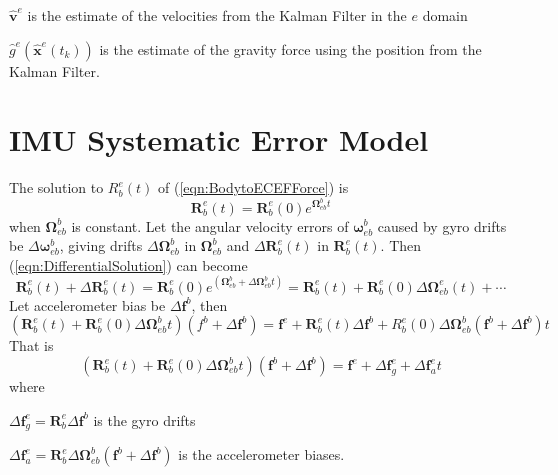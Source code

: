 \documentclass[a4paper]{report}
\numberwithin{equation}{chapter}
\newcommand{\mat}[1]{\boldsymbol{#1}}
\begin{document}
  $\hat{\mat{v}}^e$ is the estimate of the velocities from the Kalman Filter in the $e$ domain

  $\hat{g}^e \left( \hat{\mat{x}}^e \left(t_k \right) \right)$ is the estimate of the gravity force using the position from the Kalman Filter.

\section[IMU Systematic Error Model]{IMU Systematic Error Model}

The solution to $R^e_b \left( t \right)$ of (\ref{eqn:BodytoECEFForce}) is
\begin{equation}
\mat{R}^e_b \left( t \right) = \mat{R}^e_b \left( 0 \right) e^{\mat{\Omega}^b_{eb} t}
\label{eqn:DifferentialSolution}
\end{equation}
when $\mat{\Omega}^b_{eb}$ is constant. Let the angular velocity errors of $\mat{\omega}^b_{eb}$ caused by gyro drifts be $\Delta \mat{\omega}^b_{eb}$, giving drifts $\Delta \mat{\Omega}^b_{eb}$ in $\mat{\Omega}^b_{eb}$ and $\Delta \mat{R}^e_b \left( t \right)$ in $\mat{R}^e_b \left( t \right)$. Then (\ref{eqn:DifferentialSolution}) can become
\begin{equation}
\mat{R}^e_b \left( t \right) + \Delta \mat{R}^e_b \left( t \right) = \mat{R}^e_b \left( 0 \right) e^{\left( \mat{\Omega}^b_{eb} + \Delta \mat{\Omega}^b_{eb} t \right)} = \mat{R}^e_b \left( t \right) + \mat{R}^e_b \left( 0 \right) \Delta \mat{\Omega}^e_{eb} \left( t \right) + \dotsb
\end{equation}
Let accelerometer bias be $\Delta \mat{f}^b$, then
\begin{equation}
\left( \mat{R}^e_b \left( t \right) + \mat{R}^e_b \left( 0 \right) \Delta \mat{\Omega}^b_{eb} t \right) \left( f^b + \Delta \mat{f}^b \right) = \mat{f}^e + \mat{R}^e_b \left( t \right) \Delta \mat{f}^b + R^e_b \left( 0 \right) \Delta \mat{\Omega}^b_{eb} \left( \mat{f}^b + \Delta \mat{f}^b \right) t
\end{equation}
That is
\begin{equation}
\left( \mat{R}^e_b \left( t \right) + \mat{R}^e_b \left( 0 \right) \Delta \mat{\Omega}^b_{eb} t \right) \left( \mat{f}^b + \Delta \mat{f}^b \right) = \mat{f}^e + \Delta \mat{f}^e_g + \Delta \mat{f}^e_a t
\end{equation}
where

$\Delta \mat{f}^e_g = \mat{R}^e_b \Delta \mat{f}^b$ is the gyro drifts

$\Delta \mat{f}^e_a = \mat{R}^e_b \Delta \mat{\Omega}^b_{eb} \left( \mat{f}^b + \Delta \mat{f}^b \right)$ is the accelerometer biases.
\end{document}
